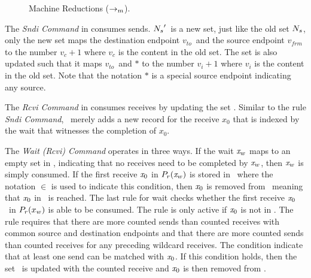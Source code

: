 \begin{figure*}[tb]
{}
\caption{Machine Reductions ($\rightarrow_{m}$). }
\label{fig:machine}
\end{figure*}

The \emph{Sndi Command} in  consumes sends. 
$\textit{$N_s$}^\prime$\ is a new set, just like the old set $\textit{$N_s$}$, only the new set maps the destination
endpoint $v_{to}$\ and the source endpoint $v_{frm}$ to the number $v_c + 1$ where $v_c$ is the content in the old set.
The set is also updated such that it maps $v_{to}$\ and $\ast$ to the number $v_i + 1$ where $v_i$ is the content in the old set. Note that the notation $\ast$ is a special source endpoint indicating any source.

The \emph{Rcvi Command} in  consumes receives by updating the set \epwait. 
Similar to the rule \emph{Sndi Command}, \epwait\ merely adds a new record for the receive $x_0$ that is indexed by the 
wait that witnesses the completion of $x_0$.

The \emph{Wait (Rcvi) Command} operates in three ways. 
If the wait $\mathit{x}_w$ maps to an empty set in \epwait, indicating that no receives need to be completed by $\mathit{x}_w$, then $\mathit{x}_w$ is simply consumed. 
If the first receive $\mathit{x}_0$ in $\textit{$P_r$}(\mathit{x}_w)$ is stored in \rcvp\ where the notation $\in$ is used to indicate this condition, then $\mathit{x}_0$ is removed from \rcvp\ meaning that $\mathit{x}_0$ in \rcvp\ is reached. 
The last rule for wait checks whether the first receive $\mathit{x}_0$\ in $\textit{$P_r$}(x_w)$ is able to be consumed. The rule is only active if $\mathit{x}_0$ is not in \rcvp. The rule requires that there are more counted sends than counted receives with common source and destination endpoints and that there are more counted sends than counted receives for any preceding wildcard receives. The condition indicate that at least one send can be matched with $\mathit{x}_0$. If this condition holds, then the set \eprcv\ is updated with the counted receive and $\mathit{x}_0$ is then removed from \epwait. 

